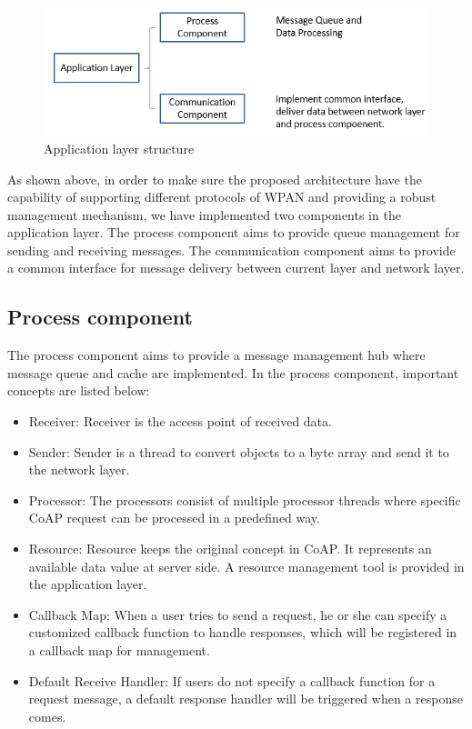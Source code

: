 \documentclass{Nan_Thesis}
\begin{document}
\begin{figure}[h]
  \centering 
      \includegraphics[scale=1]{pic/designapplicationlayer.png} 
  \caption{Application layer structure}
\end{figure} 

As shown above, in order to make sure the proposed architecture have the capability of supporting different protocols of WPAN and providing a robust management mechanism, we have implemented two components in the application layer.  The process component aims to provide queue management for sending and receiving messages. The communication component aims to provide a common interface for message delivery between current layer and network layer. 
\subsection{Process component}
The process component aims to provide a message management hub where message queue and cache are implemented. In the process component, important concepts are listed below: 

\begin{itemize}
  \item Receiver: Receiver is the access point of received data.
  \item Sender: Sender is a thread to convert objects to a byte array and send it to the network layer.
  \item Processor: The processors consist of multiple processor threads where specific CoAP request can be processed in a predefined way.
  \item Resource: Resource keeps the original concept in CoAP. It represents an available data value at server side. A resource management tool is provided in the application layer.
  \item Callback Map: When a user tries to send a request, he or she can specify a customized callback function to handle responses, which will be registered in a callback map for management.
  \item Default Receive Handler: If users do not specify a callback function for a request message, a default response handler will be triggered when a response comes.
\end{itemize}
\end{document}
